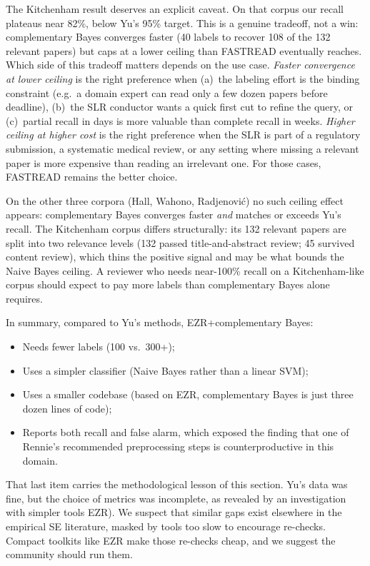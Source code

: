 \documentclass[AMA,STIX2COL]{WileyNJDv5}
\newcommand{\IT}{{\sffamily EZR}}
\begin{document}
{The Kitchenham result deserves an explicit caveat. On that
corpus our recall plateaus near 82\%, below Yu's 95\%
target. This is a genuine tradeoff, not a win:
complementary Bayes converges faster (40 labels to recover
108 of the 132 relevant papers) but caps at a lower
ceiling than FASTREAD eventually reaches. Which side of
this tradeoff matters depends on the use case. {\em
Faster convergence at lower ceiling} is the right
preference when (a)~the labeling effort is the binding
constraint (e.g.\ a domain expert can read only a few dozen
papers before deadline), (b)~the SLR conductor wants a
quick first cut to refine the query, or (c)~partial recall
in days is more valuable than complete recall in weeks.
{\em Higher ceiling at higher cost} is the right preference
when the SLR is part of a regulatory submission, a
systematic medical review, or any setting where missing a
relevant paper is more expensive than reading an irrelevant
one. For those cases, FASTREAD remains the better choice.

On the other three corpora (Hall, Wahono, Radjenovi\'c) no
such ceiling effect appears: complementary Bayes converges
faster {\em and} matches or exceeds Yu's recall. The
Kitchenham corpus differs structurally: its 132 relevant
papers are split into two relevance levels (132 passed
title-and-abstract review; 45 survived content review),
which thins the positive signal and may be what bounds the
Naive Bayes ceiling. A reviewer who needs near-100\%
recall on a Kitchenham-like corpus should expect to pay
more labels than complementary Bayes alone requires.

In summary, compared to Yu's methods, EZR+complementary Bayes:
\begin{itemize}
\item Needs fewer labels (100 vs.\ 300+);
\item Uses a simpler classifier (Naive Bayes rather than a
  linear SVM);
\item Uses a smaller codebase (based on EZR, complementary
Bayes is just three dozen lines of code);
\item Reports both recall and false alarm, which exposed the
  finding that one of Rennie's recommended preprocessing
  steps is counterproductive in this domain.
\end{itemize}

That last item carries the methodological lesson of this
section. Yu's data was fine, but the choice of metrics was
incomplete, as revealed by an investigation with  simpler tools
  \IT{}).
We suspect that
similar gaps exist elsewhere in the empirical SE literature,
masked by tools too slow to encourage re-checks. Compact
toolkits like EZR make those re-checks cheap, and we suggest
the community should run them.

}
\end{document}

